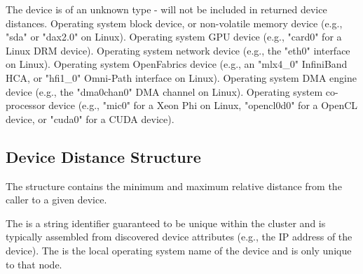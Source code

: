 \begin{constantdesc}
%
The device is of an unknown type - will not be included in returned device distances.
%
Operating system block device, or non-volatile memory device (e.g., "sda" or "dax2.0" on Linux).
%
Operating system \ac{GPU} device (e.g., "card0" for a Linux \ac{DRM} device).
%
Operating system network device (e.g., the "eth0" interface on Linux).
%
Operating system OpenFabrics device (e.g., an "mlx4_0" InfiniBand \ac{HCA}, or "hfi1_0" Omni-Path interface on Linux).
%
Operating system \ac{DMA} engine device (e.g., the "dma0chan0" \ac{DMA} channel on Linux).
%
Operating system co-processor device (e.g., "mic0" for a Xeon Phi on Linux, "opencl0d0" for a OpenCL device, or "cuda0" for a \ac{CUDA} device).
%
\end{constantdesc}

\subsection{Device Distance Structure}

The  structure contains the minimum and maximum relative distance from the caller to a given device.


The  is a string identifier guaranteed to be unique within the cluster and is typically assembled from discovered device attributes (e.g., the \ac{IP} address of the device). The  is the local operating system name of the device and is only unique to that node.

